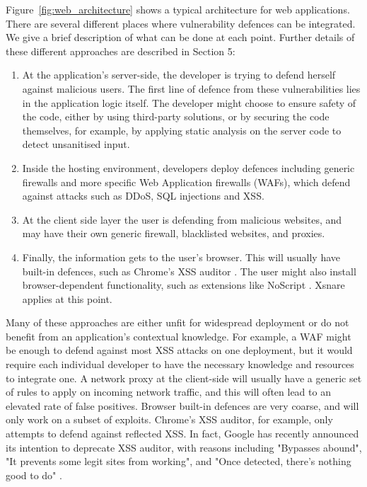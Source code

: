 Figure~\ref{fig:web_architecture} shows a typical architecture for web applications. There are several different places where vulnerability defences can be integrated. We give a brief description of what can be done at each
point. Further details of these different approaches are described in Section 5:
\begin{enumerate}
	\item  At the application's server-side, the developer is trying to defend herself against malicious users. The first line of defence from these vulnerabilities lies in the application logic itself. The developer might choose to ensure safety of the code, either by using third-party solutions, or by securing the code themselves, for example, by applying static analysis on the server code to detect unsanitised input.
	\item Inside the hosting environment, developers deploy defences including generic firewalls and more specific Web Application firewalls (WAFs), which defend against  attacks such as DDoS, SQL injections and XSS.
	\item At the client side layer the user is defending from malicious websites, and may have their own generic firewall, blacklisted websites, and proxies. 
	\item Finally, the information gets to the user's browser. This will usually have built-in defences, such as Chrome's XSS auditor \cite{xssauditor}. The user might also install browser-dependent functionality, such as extensions like NoScript \cite{Noscript}. Xsnare applies at this point.
\end{enumerate}

Many of these approaches are either unfit for widespread deployment or do not benefit from an application's contextual knowledge. For example, a WAF might be enough to defend against most XSS attacks on one deployment, but it would require each individual developer to have the necessary knowledge and resources to integrate one. A network proxy at the client-side will usually have a generic set of rules to apply on incoming network traffic, and this will often lead to an elevated rate of false positives. Browser built-in defences are very coarse, and will only work on a subset of exploits. Chrome's XSS auditor, for example, only attempts to defend against reflected XSS. In fact, Google has recently announced its intention to deprecate XSS auditor, with reasons including "Bypasses abound", "It prevents some legit sites from working", and "Once detected, there’s nothing good to do" \cite{deprecatexssauditor}.

